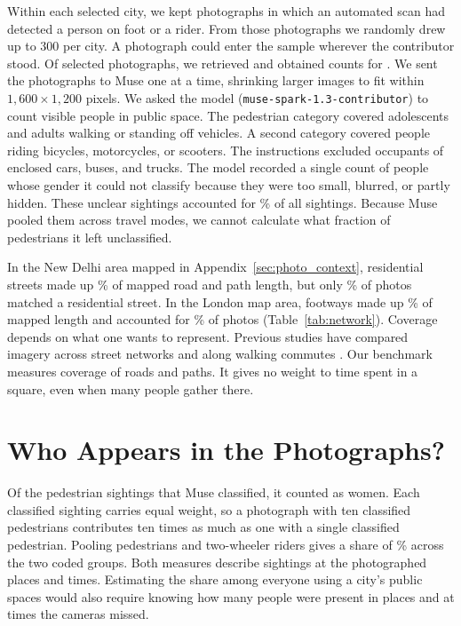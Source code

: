 \documentclass[11pt]{article}
\begin{document}
Within each selected city, we kept photographs in which an automated scan had detected a person on foot or a rider. From those photographs we randomly drew up to 300 per city. A photograph could enter the sample wherever the contributor stood. Of \DrawnImages{} selected photographs, we retrieved \DownloadedImages{} and obtained counts for \TotalImages{}. We sent the photographs to Muse one at a time, shrinking larger images to fit within $1{,}600\times1{,}200$ pixels. We asked the model (\texttt{muse-spark-1.3-contributor}) to count visible people in public space. The pedestrian category covered adolescents and adults walking or standing off vehicles. A second category covered people riding bicycles, motorcycles, or scooters. The instructions excluded occupants of enclosed cars, buses, and trucks. The model recorded a single count of people whose gender it could not classify because they were too small, blurred, or partly hidden. These unclear sightings accounted for \UnclearShare\% of all sightings. Because Muse pooled them across travel modes, we cannot calculate what fraction of pedestrians it left unclassified.

In the New Delhi area mapped in Appendix~\ref{sec:photo_context}, residential streets made up \DelhiResidentialLength\% of mapped road and path length, but only \DelhiResidentialPhotos\% of photos matched a residential street. In the London map area, footways made up \LondonFootwayLength\% of mapped length and accounted for \LondonFootwayPhotos\% of photos (Table~\ref{tab:network}). Coverage depends on what one wants to represent. Previous studies have compared imagery across street networks \citep{quinn2019every} and along walking commutes \citep{walkcoverage2023}. Our benchmark measures coverage of roads and paths. It gives no weight to time spent in a square, even when many people gather there.

\section{Who Appears in the Photographs?}
Of the \TotalPedestrians{} pedestrian sightings that Muse classified, it counted \WomenPedestrians{} as women. Each classified sighting carries equal weight, so a photograph with ten classified pedestrians contributes ten times as much as one with a single classified pedestrian. Pooling pedestrians and two-wheeler riders gives a share of \GlobalAllShare\% across the two coded groups. Both measures describe sightings at the photographed places and times. Estimating the share among everyone using a city’s public spaces would also require knowing how many people were present in places and at times the cameras missed.
\end{document}
